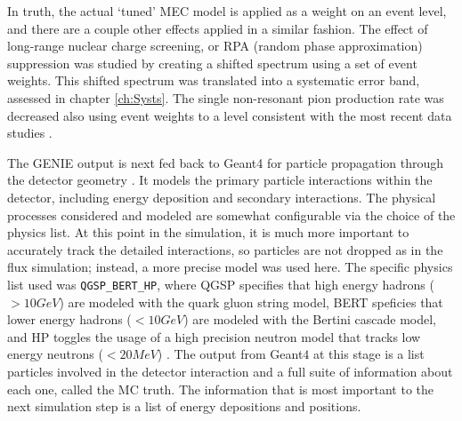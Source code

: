 In truth, the actual `tuned' MEC model is applied as a weight on an event level, and there are a couple other effects applied in a similar fashion. The effect of long-range nuclear charge screening, or RPA (random phase approximation) suppression was studied by creating a shifted spectrum using a set of event weights. This shifted spectrum was translated into a systematic error band, assessed in chapter \ref{ch:Systs}. The single non-resonant pion production rate was decreased also using event weights to a level consistent with the most recent data studies \cite{ref:TNGENIE}.

The GENIE output is next fed back to Geant4 for particle propagation through the detector geometry \cite{ref:Geant41, ref:Geant42}. It models the primary particle interactions within the detector, including energy deposition and secondary interactions. The physical processes considered and modeled are somewhat configurable via the choice of the physics list. At this point in the simulation, it is much more important to accurately track the detailed interactions, so particles are not dropped as in the flux simulation; instead, a more precise model was used here. The specific physics list used was \verb|QGSP_BERT_HP|, where QGSP specifies that high energy hadrons ($> 10\unit{GeV}$) are modeled with the quark gluon string model, BERT speficies that lower energy hadrons ($< 10\unit{GeV}$) are modeled with the Bertini cascade model, and HP toggles the usage of a high precision neutron model that tracks low energy neutrons ($< 20\unit{MeV}$) \cite{ref:TNDetSimFA}. The output from Geant$4$ at this stage is a list particles involved in the detector interaction and a full suite of information about each one, called the MC truth. The information that is most important to the next simulation step is a list of energy depositions and positions.

